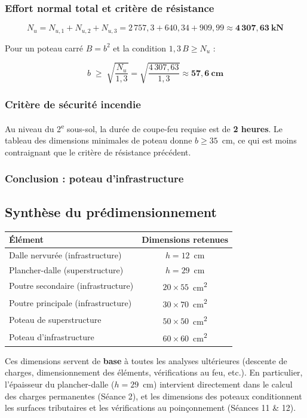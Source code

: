 \subsubsection{Effort normal total et critère de résistance}

\[
N_u = N_{u,1} + N_{u,2} + N_{u,3} = 2\,757{,}3 + 640{,}34 + 909{,}99 \approx \mathbf{4\,307{,}63~\text{kN}}
\]

Pour un poteau carré $B = b^2$ et la condition $1{,}3 \, B \geq N_u$ :

\[
b \;\geq\; \sqrt{\frac{N_u}{1{,}3}} = \sqrt{\frac{4\,307{,}63}{1{,}3}} \approx \mathbf{57{,}6~\text{cm}}
\]

\subsubsection{Critère de sécurité incendie}

Au niveau du 2\textsuperscript{e} sous-sol, la durée de coupe-feu requise est de \textbf{2 heures}. Le tableau des dimensions minimales de poteau donne $b \geq 35$~cm, ce qui est moins contraignant que le critère de résistance précédent.

\subsubsection{Conclusion : poteau d'infrastructure}


\subsection{Synthèse du prédimensionnement}

\begin{center}
\begin{tabularx}{0.85\linewidth}{Xc}
\toprule
\textbf{Élément} & \textbf{Dimensions retenues} \\
\midrule
Dalle nervurée (infrastructure)             & $h = 12$~cm \\
Plancher-dalle (superstructure)             & $h = 29$~cm \\
Poutre secondaire (infrastructure)          & $20 \times 55$~cm\textsuperscript{2} \\
Poutre principale (infrastructure)          & $30 \times 70$~cm\textsuperscript{2} \\
Poteau de superstructure                    & $50 \times 50$~cm\textsuperscript{2} \\
Poteau d'infrastructure                     & $60 \times 60$~cm\textsuperscript{2} \\
\bottomrule
\end{tabularx}
\end{center}

Ces dimensions servent de \textbf{base} à toutes les analyses ultérieures (descente de charges, dimensionnement des éléments, vérifications au feu, etc.). En particulier, l'épaisseur du plancher-dalle ($h = 29$~cm) intervient directement dans le calcul des charges permanentes (Séance 2), et les dimensions des poteaux conditionnent les surfaces tributaires et les vérifications au poinçonnement (Séances 11 \& 12).
